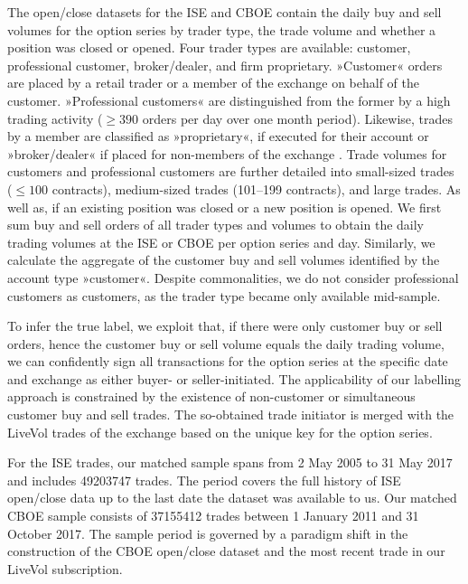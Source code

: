 The open/close datasets for the \gls{ISE} and \gls{CBOE} contain the daily buy and sell volumes for the option series by trader type, the trade volume and whether a position was closed or opened. Four trader types are available: customer, professional customer, broker/dealer, and firm proprietary. »Customer« orders are placed by a retail trader or a member of the exchange on behalf of the customer. »Professional customers« are distinguished from the former by a high trading activity ($\geq390$ orders per day over one month period). Likewise, trades by a member are classified as »proprietary«, if executed for their account or »broker/dealer« if placed for non-members of the exchange \autocite[][2]{nasdaqincFrequentlyAskedQuestions2017}. Trade volumes for customers and professional customers are further detailed into small-sized trades ($\leq 100$ contracts), medium-sized trades (101--199 contracts), and large trades. As well as, if an existing position was closed or a new position is opened. We first sum buy and sell orders of all trader types and volumes to obtain the daily trading volumes at the \gls{ISE} or \gls{CBOE} per option series and day. Similarly, we calculate the aggregate of the customer buy and sell volumes identified by the account type »customer«. Despite commonalities, we do not consider professional customers as customers, as the trader type became only available mid-sample.

To infer the true label, we exploit that, if there were only customer buy or sell orders, hence the customer buy or sell volume equals the daily trading volume, we can confidently sign all transactions for the option series at the specific date and exchange as either buyer- or seller-initiated. The applicability of our labelling approach is constrained by the existence of non-customer or simultaneous customer buy and sell trades. The so-obtained trade initiator is merged with the LiveVol trades of the exchange based on the unique key for the option series.

For the \gls{ISE} trades, our matched sample spans from 2 May 2005 to 31 May 2017 and includes \num{49203747} trades. The period covers the full history of \gls{ISE} open/close data up to the last date the dataset was available to us. Our matched \gls{CBOE} sample consists of \num{37155412} trades between 1 January 2011 and 31 October 2017. The sample period is governed by a paradigm shift in the construction of the \gls{CBOE} open/close dataset and the most recent trade in our LiveVol subscription.

